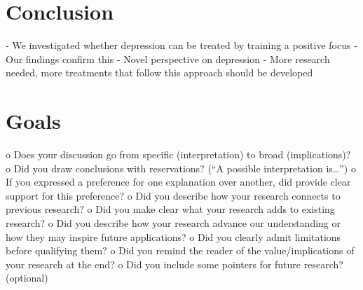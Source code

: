 \section{Conclusion}
\label{conclusion}

- We investigated whether depression can be treated by training a positive focus
- Our findings confirm this
- Novel perspective on depression
- More research needed, more treatments that follow this approach should be developed

\section{Goals}
\label{chapter4-goals}

o Does your discussion go from specific (interpretation) to broad (implications)?
o Did you draw conclusions with reservations? (“A possible interpretation is…”)
o If you expressed a preference for one explanation over another, did provide clear
support for this preference?
o Did you describe how your research connects to previous research?
o Did you make clear what your research adds to existing research?
o Did you describe how your research advance our understanding or how they may inspire
future applications?
o Did you clearly admit limitations before qualifying them?
o Did you remind the reader of the value/implications of your research at the end?
o Did you include some pointers for future research? (optional)
